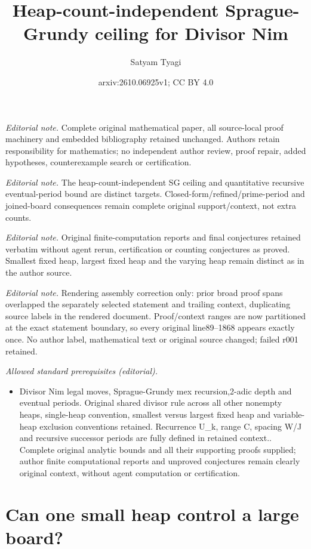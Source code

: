 \documentclass[10pt,a4paper]{article}
\title{Heap-count-independent Sprague-Grundy ceiling for Divisor Nim}
\author{Satyam Tyagi}
\date{arxiv:2610.06925v1; CC BY 4.0}
\begin{document}
\maketitle
\noindent\textit{Editorial note.} Complete original mathematical paper, all source-local proof machinery and embedded bibliography retained unchanged. Authors retain responsibility for mathematics; no independent author review, proof repair, added hypotheses, counterexample search or certification.\par\medskip
\noindent\textit{Editorial note.} The heap-count-independent SG ceiling and quantitative recursive eventual-period bound are distinct targets. Closed-form/refined/prime-period and joined-board consequences remain complete original support/context, not extra counts.\par\medskip
\noindent\textit{Editorial note.} Original finite-computation reports and final conjectures retained verbatim without agent rerun, certification or counting conjectures as proved. Smallest fixed heap, largest fixed heap and the varying heap remain distinct as in the author source.\par\medskip
\noindent\textit{Editorial note.} Rendering assembly correction only: prior broad proof spans overlapped the separately selected statement and trailing context, duplicating source labels in the rendered document. Proof/context ranges are now partitioned at the exact statement boundary, so every original line89--1868 appears exactly once. No author label, mathematical text or original source changed; failed r001 retained.\par\medskip
\noindent\textit{Allowed standard prerequisites (editorial).}\begin{itemize}
\item Divisor Nim legal moves, Sprague-Grundy mex recursion,2-adic depth and eventual periods. Original shared divisor rule across all other nonempty heaps, single-heap convention, smallest versus largest fixed heap and variable-heap exclusion conventions retained. Recurrence U\_k, range C, spacing W/J and recursive successor periods are fully defined in retained context.. Complete original analytic bounds and all their supporting proofs supplied; author finite computational reports and unproved conjectures remain clearly original context, without agent computation or certification.
\end{itemize}\medskip
\section{Can one small heap control a large board?}
\label{sec:intro}
\end{document}
